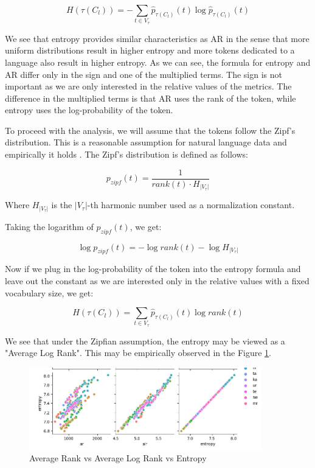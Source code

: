 \begin{equation}
    H(\tau(C_l)) = - \sum_{t \in V_\tau} \hat{p}_{\tau(C_l)}(t) \log \hat{p}_{\tau(C_l)}(t)
\end{equation}

We see that entropy provides similar characteristics as AR in the sense that more uniform distributions result in higher entropy and more tokens dedicated to a language also result in higher entropy. As we can see, the formula for entropy and AR differ only in the sign and one of the multiplied terms. The sign is not important as we are only interested in the relative values of the metrics. The difference in the multiplied terms is that AR uses the rank of the token, while entropy uses the log-probability of the token. 

To proceed with the analysis, we will assume that the tokens follow the Zipf's distribution. This is a reasonable assumption for natural language data and empirically it holds . The Zipf's distribution is defined as follows:

\begin{equation}
    p_{zipf}(t) = \frac{1}{rank(t) \cdot H_{|V_\tau|}}
\end{equation}

Where $H_{|V_\tau|}$ is the $|V_\tau|$-th harmonic number used as a normalization constant.

Taking the logarithm of $p_{zipf}(t)$, we get:

\begin{equation}
    \log p_{zipf}(t) = - \log rank(t) - \log H_{|V_\tau|}
\end{equation}

Now if we plug in the log-probability of the token into the entropy formula and leave out the constant as we are interested only in the relative values with a fixed vocabulary size, we get:

\begin{equation}
    H(\tau(C_l)) = \sum_{t \in V_\tau} \hat{p}_{\tau(C_l)}(t) \log rank(t)
\end{equation}

We see that under the Zipfian assumption, the entropy may be viewed as a "Average Log Rank". This may be empirically observed in the Figure \ref{fig:ar_alr_entropy}.

\begin{figure}
    \centering
    \includegraphics[width=0.9\textwidth]{img/temp/ar_alr_entropy.jpg}
    \caption{Average Rank vs Average Log Rank vs Entropy}
    \label{fig:ar_alr_entropy}
\end{figure}

